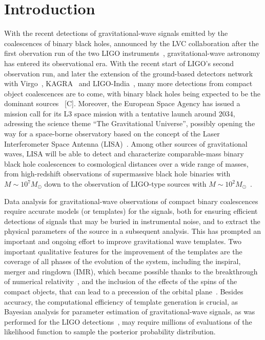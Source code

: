 \documentclass[aps,showpacs,twocolumn,
prd,superscriptaddress,nofootinbib]{revtex4-1}
\newcommand{\Msol}{M_{\odot}}
\newcommand{\SM}[1]{{\color{Red} #1}}
\begin{document}
\maketitle


\section{Introduction}
\label{sec:intro}

With the recent detections of gravitational-wave signals emitted by the coalescences of binary black holes, announced by the LVC collaboration after the first obervation run of the two LIGO instruments~\cite{LIGO-theevent-2016,LIGO-christmasevent-2016,LIGO-O1BBH-2016}, gravitational-wave astronomy has entered its observational era. With the recent start of LIGO's second observation run, and later the extension of the ground-based detectors network with Virgo~\cite{Virgo}, KAGRA~\cite{KAGRA} and LIGO-India~\cite{INDIGO}, many more detections from compact object coalescences are to come, with binary black holes being expected to be the dominant sources~\cite{} \SM{[C]}. Moreover, the European Space Agency has issued a mission call for its L3 space mission with a tentative launch around 2034, adressing the science theme ``The Gravitational Universe'', possibly opening the way for a space-borne observatory based on the concept of the Laser Interferometer Space Antenna (LISA)~\cite{LISA09,LISA17}. Among other sources of gravitational waves, LISA will be able to detect and characterize comparable-mass binary black hole coalescences to cosmological distances over a wide range of masses, from high-redshift observations of supermassive black hole binaries with $M\sim 10^{7} \Msol$ down to the observation of LIGO-type sources with $M\sim 10^{2} \Msol$~\cite{Sesana16}.

Data analysis for gravitational-wave observations of compact binary coalescences require accurate models (or templates) for the signals, both for ensuring efficient detections of signals that may be buried in instrumental noise, and to extract the physical parameters of the source in a subsequent analysis. This has prompted an important and ongoing effort to improve gravitational wave templates. Two important qualitative features for the improvement of the templates are the coverage of all phases of the evolution of the system, including the inspiral, merger and ringdown (IMR), which became possible thanks to the breakthrough of numerical relativity~\cite{Pretorius05,Baker+06,Campanelli+06}, and the inclusion of the effects of the spins of the compact objects, that can lead to a precession of the orbital plane~\cite{ACST94,K95}. Besides accuracy, the computational efficiency of template generation is crucial, as Bayesian analysis for parameter estimation of gravitational-wave signals, as was performed for the LIGO detections~\cite{LIGO-theeventPE-2016,LIGO-O1BBH-2016}, may require millions of evaluations of the likelihood function to sample the posterior probability distribution.
\end{document}
